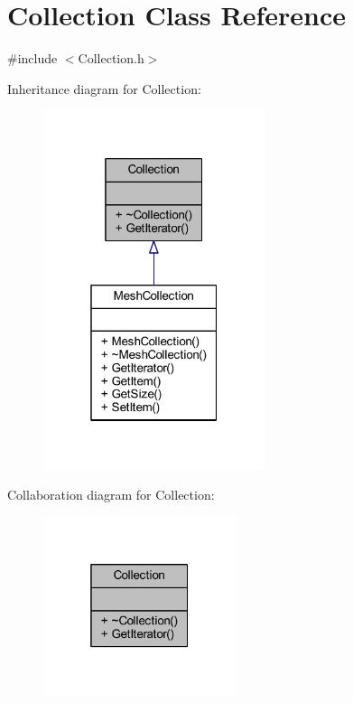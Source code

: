 \hypertarget{class_collection}{}\section{Collection Class Reference}
\label{class_collection}


{\ttfamily \#include $<$Collection.\+h$>$}



Inheritance diagram for Collection\+:
\nopagebreak
\begin{figure}[H]
\begin{center}
\leavevmode
\includegraphics[width=184pt]{class_collection__inherit__graph}
\end{center}
\end{figure}


Collaboration diagram for Collection\+:
\nopagebreak
\begin{figure}[H]
\begin{center}
\leavevmode
\includegraphics[width=160pt]{class_collection__coll__graph}
\end{center}
\end{figure}
